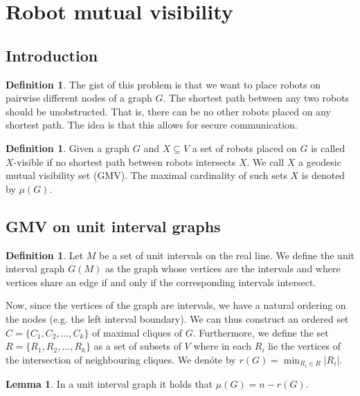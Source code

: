 \documentclass[a4paper, 12pt]{article}
\theoremstyle{plain}
\theoremstyle{definition}
\newtheorem{definition}[theorem]{Definition} %
\theoremstyle{lemma}
\newtheorem{lemma}[theorem]{Lemma}
\theoremstyle{remark}
\theoremstyle{corollary}
\theoremstyle{example}
\begin{document}
\section{Robot mutual visibility}
	\subsection{Introduction}
	\begin{definition}
		The gist of this problem is that we want to place robots on pairwise different nodes of a graph $G$. The shortest path between any two robots should be unobstructed. That is, there can be no other robots placed on any shortest path. The idea is that this allows for secure communication.
	\end{definition}
	\begin{definition}
		Given a graph $G$ and $X \subseteq V$ a set of robots placed on $G$ is called $X$-visible if no shortest path between robots intersects $X$. We call $X$ a geodesic mutual visibility set (GMV). The maximal cardinality of such sets $X$ is denoted by $\mu(G)$.
	\end{definition}
	\subsection{GMV on unit interval graphs}
	\begin{definition}
		Let $M$ be a set of unit intervals on the real line. We define the unit interval graph $G(M)$ as the graph whose vertices are the intervals and where vertices share an edge if and only if the corresponding intervals intersect. 
	\end{definition}
	Now, since the vertices of the graph are intervals, we have a natural ordering on the nodes (e.g. the left interval boundary). We can thus construct an ordered set $C = \{C_1,C_2,...,C_k\}$ of maximal cliques of $G$. Furthermore, we define the set $R = \{R_1,R_2,...,R_k\}$ as a set of subsets of $V$ where in each $R_i$ lie the vertices of the intersection of neighbouring cliques. We denóte by $r(G) = \min_{R_i \in R} \left|R_i\right|$.
	\begin{lemma}
		In a unit interval graph it holds that $\mu(G) = n - r(G)$.
	\end{lemma}
\end{document}
